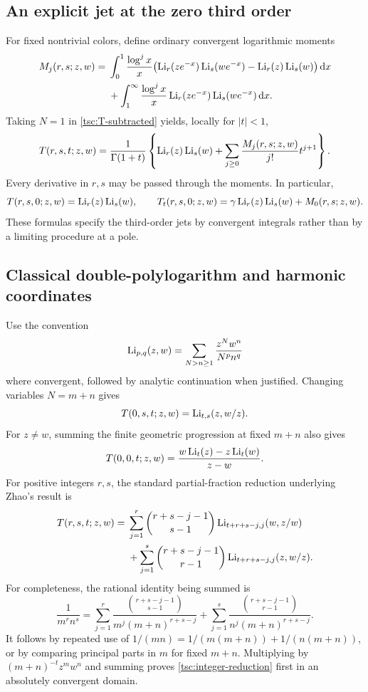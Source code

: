 \subsection{An explicit jet at the zero third order}
For fixed nontrivial colors, define ordinary convergent logarithmic moments
\begin{align}\label{tsc:Mmoments}
 M_j(r,s;z,w)={}&\int_0^1\frac{\log^j x}{x}
        \bigl(\operatorname{Li}_r(ze^{-x})\operatorname{Li}_s(we^{-x})-\operatorname{Li}_r(z)\operatorname{Li}_s(w)\bigr)\,\mathrm d x\notag\\
 &+\int_1^\infty\frac{\log^j x}{x}
                    \operatorname{Li}_r(ze^{-x})\operatorname{Li}_s(we^{-x})\,\mathrm d x.
\end{align}
Taking $N=1$ in \eqref{tsc:T-subtracted} yields, locally for $|t|<1$,
\begin{equation}\label{tsc:T-zero-jet}
 T(r,s,t;z,w)=\frac1{\Gamma(1+t)}
  \left\{\operatorname{Li}_r(z)\operatorname{Li}_s(w)+
               \sum_{j\ge0}\frac{M_j(r,s;z,w)}{j!}t^{j+1}\right\}.
\end{equation}
Every derivative in $r,s$ may be passed through the moments. In particular,
\[
 T(r,s,0;z,w)=\operatorname{Li}_r(z)\operatorname{Li}_s(w),\qquad
 T_t(r,s,0;z,w)=\gamma\operatorname{Li}_r(z)\operatorname{Li}_s(w)+M_0(r,s;z,w).
\]
These formulas specify the third-order jets by convergent integrals rather
than by a limiting procedure at a pole.

\subsection{Classical double-polylogarithm and harmonic coordinates}
Use the convention
\[
 \operatorname{Li}_{p,q}(z,w)=\sum_{N>n\ge1}\frac{z^Nw^n}{N^p n^q}
\]
where convergent, followed by analytic continuation when justified.
Changing variables $N=m+n$ gives
\begin{equation}\label{tsc:T-zero-first}
 T(0,s,t;z,w)=\operatorname{Li}_{t,s}(z,w/z).
\end{equation}
For $z\ne w$, summing the finite geometric progression at fixed $m+n$
also gives
\begin{equation}\label{tsc:T00}
 T(0,0,t;z,w)=\frac{w\operatorname{Li}_t(z)-z\operatorname{Li}_t(w)}{z-w}.
\end{equation}
For positive integers $r,s$, the standard partial-fraction reduction
underlying Zhao's result \cite{tsc:zhao} is
\begin{align}\label{tsc:integer-reduction}
 T(r,s,t;z,w)={}&\sum_{j=1}^r\binom{r+s-j-1}{s-1}
                     \operatorname{Li}_{t+r+s-j,j}(w,z/w)\notag\\
 &+\sum_{j=1}^s\binom{r+s-j-1}{r-1}
                     \operatorname{Li}_{t+r+s-j,j}(z,w/z).
\end{align}
For completeness, the rational identity being summed is
\[
 \frac1{m^r n^s}=
  \sum_{j=1}^r\frac{\binom{r+s-j-1}{s-1}}{m^j(m+n)^{r+s-j}}
 +\sum_{j=1}^s\frac{\binom{r+s-j-1}{r-1}}{n^j(m+n)^{r+s-j}}.
\]
It follows by repeated use of
$1/(mn)=1/(m(m+n))+1/(n(m+n))$, or by comparing principal parts in
$m$ for fixed $m+n$. Multiplying by $(m+n)^{-t}z^mw^n$ and summing proves
\eqref{tsc:integer-reduction} first in an absolutely convergent domain.

